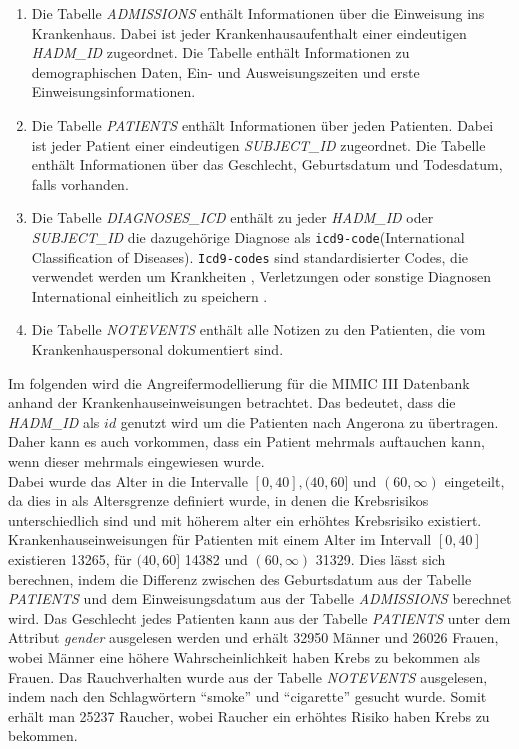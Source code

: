 \documentclass[german,version-2020-11]{uzl-thesis}
\begin{document}
\begin{enumerate}
	\item Die Tabelle \textit{ADMISSIONS}  enthält Informationen über die Einweisung ins Krankenhaus. Dabei ist jeder Krankenhausaufenthalt einer eindeutigen \textit{HADM\_ID} zugeordnet. Die Tabelle enthält Informationen zu demographischen Daten, Ein- und Ausweisungszeiten und erste Einweisungsinformationen.
	\item Die Tabelle \textit{PATIENTS} enthält Informationen über jeden Patienten. Dabei ist jeder Patient einer eindeutigen \textit{SUBJECT\_ID} zugeordnet. Die Tabelle enthält Informationen über das Geschlecht, Geburtsdatum und Todesdatum, falls vorhanden.
	\item Die Tabelle \textit{DIAGNOSES\_ICD} enthält zu jeder \textit{HADM\_ID} oder \textit{SUBJECT\_ID} die dazugehörige Diagnose als \texttt{icd9-code}(International Classification of Diseases). \texttt{Icd9-codes} sind standardisierter Codes, die verwendet  werden um Krankheiten , Verletzungen oder sonstige Diagnosen International einheitlich zu speichern \cite{15}.
	\item Die Tabelle \textit{NOTEVENTS} enthält alle Notizen zu den Patienten, die vom Krankenhauspersonal dokumentiert sind.
\end{enumerate} 
Im folgenden wird die Angreifermodellierung für die MIMIC III Datenbank anhand der Krankenhauseinweisungen betrachtet. Das bedeutet, dass die \textit{HADM\_ID} als $id$ genutzt wird um die Patienten nach Angerona zu übertragen. Daher kann es auch vorkommen, dass ein Patient mehrmals auftauchen kann, wenn dieser mehrmals eingewiesen wurde.\\ 
Dabei wurde das Alter in die Intervalle $[0,40], (40,60]$ und $(60,\infty)$ eingeteilt, da dies in \cite{13} als Altersgrenze definiert wurde, in denen die Krebsrisikos unterschiedlich sind und mit höherem alter ein erhöhtes Krebsrisiko existiert. Krankenhauseinweisungen für Patienten mit einem Alter im Intervall $[0,40]$ existieren 13265, für $(40,60]$ 14382 und $(60,\infty)$ 31329. Dies lässt sich berechnen, indem die Differenz zwischen des Geburtsdatum aus der Tabelle \textit{PATIENTS} und dem Einweisungsdatum aus der Tabelle \textit{ADMISSIONS} berechnet wird.
Das Geschlecht jedes Patienten kann aus der Tabelle \textit{PATIENTS} unter dem Attribut \textit{gender} ausgelesen werden und erhält 32950 Männer und 26026 Frauen, wobei Männer eine höhere Wahrscheinlichkeit haben Krebs zu bekommen als Frauen. Das Rauchverhalten wurde aus der Tabelle \textit{NOTEVENTS} ausgelesen, indem nach den Schlagwörtern \enquote{smoke} und \enquote{cigarette} gesucht wurde. Somit erhält man 25237 Raucher, wobei Raucher ein erhöhtes Risiko haben Krebs zu bekommen. \\
\end{document}
